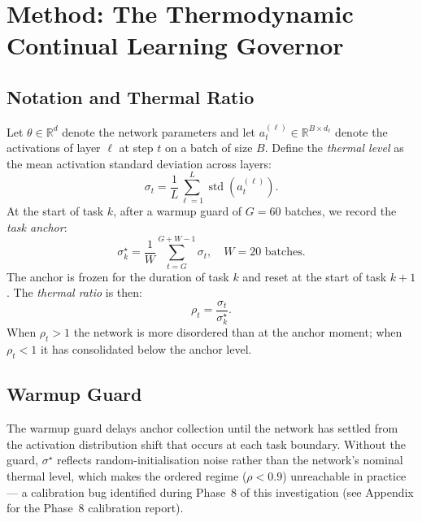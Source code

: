 
\section{Method: The Thermodynamic Continual Learning Governor}
\label{sec:method}

\subsection{Notation and Thermal Ratio}

Let $\theta \in \mathbb{R}^d$ denote the network parameters and let
$a^{(\ell)}_t \in \mathbb{R}^{B \times d_\ell}$ denote the activations of layer $\ell$
at step $t$ on a batch of size $B$.
Define the \emph{thermal level} as the mean activation standard deviation across layers:
\begin{equation}
    \sigma_t = \frac{1}{L}\sum_{\ell=1}^{L} \operatorname{std}\!\left(a^{(\ell)}_t\right).
\end{equation}
At the start of task $k$, after a warmup guard of $G = 60$ batches, we record the
\emph{task anchor}:
\begin{equation}
    \sigma^\star_k = \frac{1}{W}\sum_{t=G}^{G+W-1} \sigma_t,
    \quad W = 20 \text{ batches}.
    \label{eq:anchor}
\end{equation}
The anchor is frozen for the duration of task $k$ and reset at the start of task $k+1$.
The \emph{thermal ratio} is then:
\begin{equation}
    \rho_t = \frac{\sigma_t}{\sigma^\star_k}.
    \label{eq:rho}
\end{equation}
When $\rho_t > 1$ the network is more disordered than at the anchor moment; when
$\rho_t < 1$ it has consolidated below the anchor level.

\subsection{Warmup Guard}

The warmup guard delays anchor collection until the network has settled from the
activation distribution shift that occurs at each task boundary.
Without the guard, $\sigma^\star$ reflects random-initialisation noise rather than
the network's nominal thermal level, which makes the ordered regime ($\rho < 0.9$)
unreachable in practice --- a calibration bug identified during Phase~8 of this
investigation (see Appendix for the Phase~8 calibration report).

